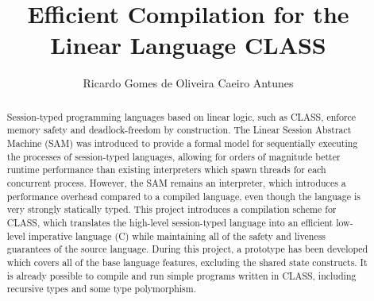 \documentclass[a4paper]{article}
\begin{document}
\title{Efficient Compilation for the Linear Language CLASS} %
\author{Ricardo Gomes de Oliveira Caeiro Antunes} %

\maketitle
\thispagestyle{empty}

\setlength{\abstitleskip}{-\absparindent}
\begin{abstract}
    Session-typed programming languages based on linear logic, such as CLASS, enforce memory safety and deadlock-freedom by construction. The Linear Session Abstract Machine (SAM) was introduced to provide a formal model for sequentially executing the processes of session-typed languages, allowing for orders of magnitude better runtime performance than existing interpreters which spawn threads for each concurrent process. However, the SAM remains an interpreter, which introduces a performance overhead compared to a compiled language, even though the language is very strongly statically typed. This project introduces a compilation scheme for CLASS, which translates the high-level session-typed language into an efficient low-level imperative language (C) while maintaining all of the safety and liveness guarantees of the source language. During this project, a prototype has been developed which covers all of the base language features, excluding the shared state constructs. It is already possible to compile and run simple programs written in CLASS, including recursive types and some type polymorphism.
    \clearpage
\end{abstract}

\tableofcontents
\thispagestyle{empty}
\clearpage
\end{document}
